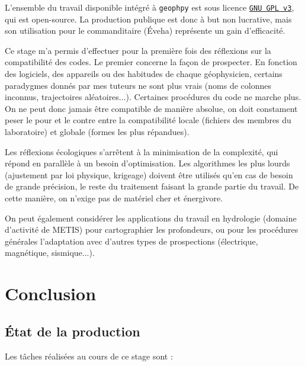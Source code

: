 \documentclass[12pt]{article}
\begin{document}
    L'ensemble du travail disponible intégré à \texttt{geophpy} est sous licence \href{https://www.gnu.org/licenses/gpl-3.0.en.html}{\texttt{GNU GPL v3}}, qui est open-source. La production publique est donc à but non lucrative, mais son utilisation pour le commanditaire (Éveha) représente un gain d'efficacité.

    Ce stage m'a permis d'effectuer pour la première fois des réflexions sur la compatibilité des codes. Le premier concerne la façon de prospecter. En fonction des logiciels, des appareils ou des habitudes de chaque géophysicien, certains paradygmes donnés par mes tuteurs ne sont plus vrais (noms de colonnes inconnus, trajectoires aléatoires...). Certaines procédures du code ne marche plus. On ne peut donc jamais être compatible de manière absolue, on doit constament peser le pour et le contre entre la compatibilité locale (fichiers des membres du laboratoire) et globale (formes les plus répandues).

    \vskip 15pt

    Les réflexions écologiques s'arrêtent à la minimisation de la complexité, qui répond en parallèle à un besoin d'optimisation. Les algorithmes les plus lourds (ajustement par loi physique, krigeage) doivent être utilisés qu'en cas de besoin de grande précision, le reste du traitement faisant la grande partie du travail. De cette manière, on n'exige pas de matériel cher et énergivore.

    On peut également considérer les applications du travail en hydrologie (domaine d'activité de METIS) pour cartographier les profondeurs, ou pour les procédures générales l'adaptation avec d'autres types de prospections (électrique, magnétique, sismique...).

\newpage
\section{Conclusion}
\subsection{État de la production}

    Les tâches réalisées au cours de ce stage sont :
\end{document}
